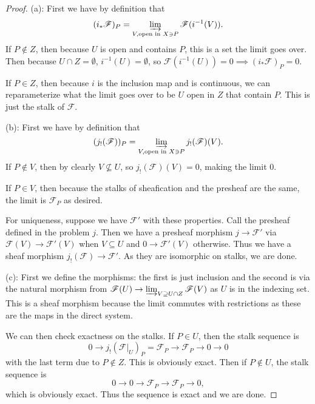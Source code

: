 \begin{proof}
	(a): First we have by definition that
	\[
		(i_\ast \mathscr{F})_P = \varinjlim_{V, \text{open in $X $} \ni P} \mathscr{F}(i^{-1}(V))
	.\] 
	If $P\notin Z $, then because $U $ is open and contains $P $, this is a set the limit goes over.
	Then because $U\cap Z = \emptyset $, $i^{-1}(U) = \emptyset $, so $\mathscr{F}(i^{-1}(U)) = 0 \implies (i_\ast \mathscr{F})_P = 0 $.

	If $P\in Z $, then because $i $ is the inclusion map and is continuous, we can reparameterize what the limit goes over to be $U $ open in $Z $ that contain $P $.
	This is just the stalk of $\mathscr{F} $.

	(b): First we have by definition that
	\[
		(j_! (\mathscr{F}))_P = \varinjlim_{V, \text{open in $X $} \ni P} j_!(\mathscr{F})(V)
	.\] 
	If $P \notin V $, then by clearly $V\not\subseteq U $, so $j_!(\mathscr{F})(V) = 0 $, making the limit $0 $.

	If $P\in V $, then because the stalks of sheafication and the presheaf are the same, the limit is $\mathscr{F}_P $ as desired.

	For uniqueness, suppose we have $\mathscr{F}' $ with these properties.
	Call the presheaf defined in the problem $j $.
	Then we have a presheaf morphism $j\to \mathscr{F}' $ via $\mathscr{F}(V) \to \mathscr{F}'(V) $ when $V \subseteq U $ and $0\to \mathscr{F}'(V) $ otherwise.
	Thus we have a sheaf morphism $j_! (\mathscr{F}) \to \mathscr{F}' $.
	As they are isomorphic on stalks, we are done.

	(c): First we define the morphisms: the first is just inclusion and the second is via the natural morphism from $\mathscr{F}(U) \to \varinjlim_{V \supseteq U\cap Z} \mathscr{F}(V) $ as $U $ is in the indexing set.
	This is a sheaf morphism because the limit commutes with restrictions as these are the maps in the direct system.

	We can then check exactness on the stalks.
	If $P \in U $, then the stalk sequence is
	\[
		0 \to j_!(\mathscr{F}|_U)_P = \mathscr{F}_P \to \mathscr{F}_P \to 0 \to 0
	\] 
	with the last term due to $P\notin Z $.
	This is obviously exact.
	Then if $P\notin U $, the stalk sequence is
	\[
		0\to 0\to \mathscr{F}_P \to \mathscr{F}_P \to 0,
	\] 
	which is obviously exact.
	Thus the sequence is exact and we are done.
\end{proof}

